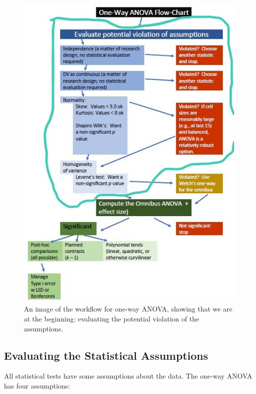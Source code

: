 \documentclass[
  english,
]{book}
\begin{document}
\begin{figure}
\centering
\includegraphics{images/OnewayWrkFlw_Asmptns.jpg}
\caption{An image of the workflow for one-way ANOVA, showing that we are at the beginning: evaluating the potential violation of the assumptions.}
\end{figure}

\hypertarget{evaluating-the-statistical-assumptions}{%
\subsection{Evaluating the Statistical Assumptions}\label{evaluating-the-statistical-assumptions}}

All statistical tests have some assumptions about the data. The one-way ANOVA has four assumptions:
\end{document}
